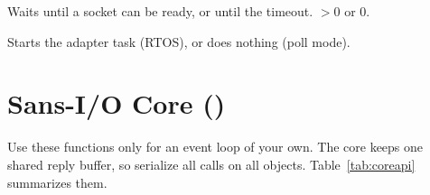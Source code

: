 Waits until a socket can be ready, or until the timeout. $>0$ or 0.

Starts the adapter task (RTOS), or does nothing (poll mode).

\section{Sans-I/O Core ()}

Use these functions only for an event loop of your own. The core keeps one
shared reply buffer, so serialize all calls on all  objects.
Table~\ref{tab:coreapi} summarizes them.

